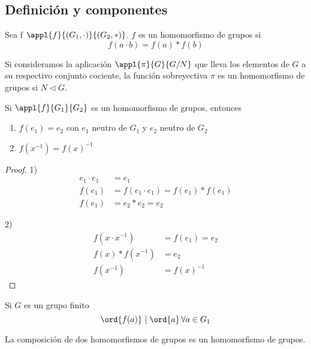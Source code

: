 \documentclass[nochap]{apuntes}
\begin{document}
\subsection{Definición y componentes}
\begin{defn}[Homomorfismo]
 Sea f $\appl{f}{(G_1, \cdot )}{(G_2, \ast )}$. $f$ es un homomorfismo de grupos si 
 \[ f(a\cdot b) = f(a)\ast f(b) \]
 \end{defn}
 
 \begin{example}
 Si consideramos la aplicación $\appl{\pi}{G}{G/N}$ que lleva los elementos de $G$ a su respectivo conjunto cociente, la función sobreyectiva $\pi$ es un homomorfismo de grupos si $N\lhd G$.
 \end{example}
 
 \begin{props} 
 Si $\appl{f}{G_1}{G_2}$ es un homomorfismo de grupos, entonces
 \begin{enumerate}
 \item $f(e_1) = e_2$ con $e_1$ neutro de $G_1$ y $e_2$ neutro de $G_2$
 \item $f(x^{-1}) = f(x)^{-1}$
 \end{enumerate}
 \end{props}
 
 \begin{proof} 
 1) 
 \begin{align*}
 e_1\cdot e_1 &= e_1 \\
 f(e_1)& =f(e_1\cdot e_1) = f(e_1)\ast f(e_1) \\
 f(e_1) &= e_2 \ast e_2 = e_2
 \end{align*}

 2) \begin{align*}
 f(x\cdot x^{-1}) &= f(e_1) = e_2 \\ 
 f(x)\ast f(x^{-1}) &= e_2 \\
  f(x^{-1}) &= f(x)^{-1}
  \end{align*}
 
 \end{proof}
 
 

\begin{remark} Si $G$ es un grupo finito \[\ord{f(a)}\ |\;\ord{a}\, \forall a \in G_1 \] \end{remark}

\begin{lemma}
La composición de dos homomorfismos de grupos es un homomorfismo de grupos.
\end{lemma}
\end{document}
